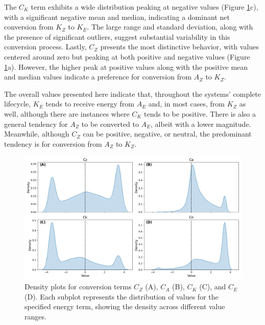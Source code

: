 The $C_K$ term exhibits a wide distribution peaking at negative values (Figure \ref{fig:ridge_plot_Conversion_Terms_total}c), with a significant negative mean and median, indicating a dominant net conversion from $K_Z$ to $K_E$. The large range and standard deviation, along with the presence of significant outliers, suggest substantial variability in this conversion process. Lastly, $C_Z$ presents the most distinctive behavior, with values centered around zero but peaking at both positive and negative values (Figure \ref{fig:ridge_plot_Conversion_Terms_total}a). However, the higher peak at positive values along with the positive mean and median values indicate a preference for conversion from $A_Z$ to $K_Z$. 

The overall values presented here indicate that, throughout the systems' complete lifecycle, $K_E$ tends to receive energy from $A_E$ and, in most cases, from $K_Z$ as well, although there are instances where $C_K$ tends to be positive. There is also a general tendency for $A_Z$ to be converted to $A_E$, albeit with a lower magnitude. Meanwhile, although $C_Z$ can be positive, negative, or neutral, the predominant tendency is for conversion from $A_Z$ to $K_Z$.

\begin{figure}[!htbp]
\centering
\includegraphics[width=32pc]{figs_5/ridge_plot_Conversion_Terms_total.png}
\caption[Density Plots - Conversion Terms]{Density plots for conversion terms $C_Z$ (A), $C_A$ (B), $C_K$ (C), and $C_E$ (D). Each subplot represents the distribution of values for the specified energy term, showing the density across different value ranges.}
\label{fig:ridge_plot_Conversion_Terms_total}
\end{figure}


